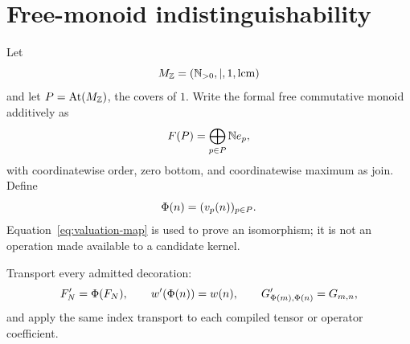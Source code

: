 \section{Free-monoid indistinguishability}
\label{sec:clone-theorem}

Let
\begin{equation}
 M_{\mathbb Z}=(\mathbb N_{>0},\mid,1,\operatorname{lcm})
 \label{eq:integer-monoid}
\end{equation}
and let \(P=\operatorname{At}(M_{\mathbb Z})\), the covers of \(1\).  Write the formal free
commutative monoid additively as
\begin{equation}
 F(P)=\bigoplus_{p\in P}\mathbb N e_p,
 \label{eq:formal-monoid}
\end{equation}
with coordinatewise order, zero bottom, and coordinatewise maximum as join.
Define
\begin{equation}
 \Phi(n)=(v_p(n))_{p\in P}.
 \label{eq:valuation-map}
\end{equation}
Equation~\eqref{eq:valuation-map} is used to prove an isomorphism; it is not
an operation made available to a candidate kernel.

Transport every admitted decoration:
\begin{equation}
 F'_N=\Phi(F_N),\qquad
 w'(\Phi(n))=w(n),\qquad
 G'_{\Phi(m),\Phi(n)}=G_{m,n},
 \label{eq:transport}
\end{equation}
and apply the same index transport to each compiled tensor or operator
coefficient.


